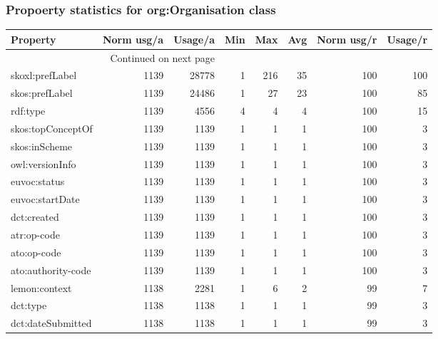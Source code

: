 \documentclass[10pt,a4paper,titlepage,final]{article}
\begin{document}
\subsubsection{Propoerty statistics for org:Organisation class}
\begin{longtable}{lrrrrrrr}
\toprule
               Property &  Norm usg/a &  Usage/a &  Min &  Max &  Avg &  Norm usg/r &  Usage/r \\
\midrule
\endhead
\midrule
\multicolumn{3}{r}{{Continued on next page}} \\
\midrule
\endfoot

\bottomrule
\endlastfoot
        skoxl:prefLabel &        1139 &    28778 &    1 &  216 &   35 &         100 &      100 \\
         skos:prefLabel &        1139 &    24486 &    1 &   27 &   23 &         100 &       85 \\
               rdf:type &        1139 &     4556 &    4 &    4 &    4 &         100 &       15 \\
      skos:topConceptOf &        1139 &     1139 &    1 &    1 &    1 &         100 &        3 \\
          skos:inScheme &        1139 &     1139 &    1 &    1 &    1 &         100 &        3 \\
        owl:versionInfo &        1139 &     1139 &    1 &    1 &    1 &         100 &        3 \\
           euvoc:status &        1139 &     1139 &    1 &    1 &    1 &         100 &        3 \\
        euvoc:startDate &        1139 &     1139 &    1 &    1 &    1 &         100 &        3 \\
            dct:created &        1139 &     1139 &    1 &    1 &    1 &         100 &        3 \\
            atr:op-code &        1139 &     1139 &    1 &    1 &    1 &         100 &        3 \\
            ato:op-code &        1139 &     1139 &    1 &    1 &    1 &         100 &        3 \\
     ato:authority-code &        1139 &     1139 &    1 &    1 &    1 &         100 &        3 \\
          lemon:context &        1138 &     2281 &    1 &    6 &    2 &          99 &        7 \\
               dct:type &        1138 &     1138 &    1 &    1 &    1 &          99 &        3 \\
      dct:dateSubmitted &        1138 &     1138 &    1 &    1 &    1 &          99 &        3 \\

\end{longtable}
\end{document}
